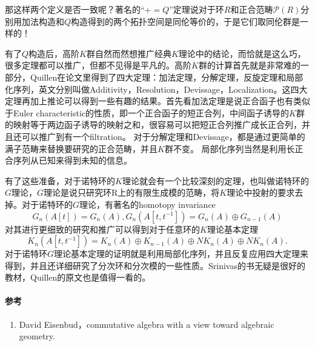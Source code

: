 那这样两个定义是否一致呢？著名的“$+ = Q$”定理说对于环$R$和正合范畴$\mathcal{P}(R)$分别用加法构造和$Q$构造得到的两个拓扑空间是同伦等价的，于是它们取同伦群是一样的！

有了$Q$构造后，高阶$K$群自然而然想推广经典$K$理论中的结论，而恰就是这么巧，很多定理都可以推广，但都不见得是平凡的。高阶$K$群的计算首先就是非常难的一部分，Quillen在论文里得到了四大定理：加法定理，分解定理，反旋定理和局部化序列，英文分别叫做Additivity，Resolution，Devissage，Localization。这四大定理再加上推论可以得到一些有趣的结果。首先看加法定理是说正合函子也有类似于Euler characteristic的性质，即一个正合函子的短正合列，中间函子诱导的$K$群的映射等于两边函子诱导的映射之和，很容易可以把短正合列推广成长正合列，并且还可以推广到有一个filtration。
对于分解定理和Devissage，都是通过更简单的满子范畴来替换要研究的正合范畴，并且$K$群不变。
局部化序列当然是利用长正合序列从已知来得到未知的信息。

有了这些准备，对于诺特环的$K$理论就会有一个比较深刻的定理，也叫做诺特环的$G$理论，$G$理论是说只研究环R上的有限生成模的范畴，将$K$理论中投射的要求去掉。对于诺特环的$G$理论，有著名的homotopy invariance \[G_n(A[t])=G_n(A),G_n(A[t,t^{-1}])=G_n(A)\oplus G_{n-1}(A)\]
对其进行更细致的研究和推广可以得到对于任意环的$K$理论基本定理
\[K_n(A[t,t^{-1}])=K_n(A)\oplus K_{n-1}(A) \oplus NK_n(A) \oplus NK_n(A).\]
对于诺特环$G$理论基本定理的证明就是利用局部化序列，并且反复应用四大定理来得到，并且还详细研究了分次环和分次模的一些性质。Srinivas的书无疑是很好的教材，Quillen的原文也是值得一看的。

\paragraph{参考}
\begin{enumerate}
  \item David Eisenbud，commutative algebra with a view toward algebraic geometry.
 
\end{enumerate}

% 





















